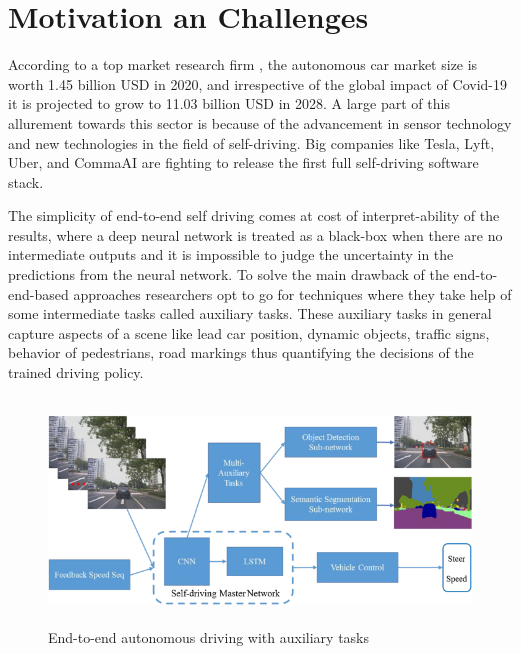     \section{Motivation an Challenges}
    According to a top market research firm \cite{market_survey}, the autonomous car market size is worth 1.45 billion USD in 2020, and irrespective of the global impact of Covid-19 it is projected to grow to 11.03 billion USD in 2028. A large part of this allurement towards this sector is because of the advancement in sensor technology and new technologies in the field of self-driving. Big companies like Tesla, Lyft, Uber, and CommaAI are fighting to release the first full self-driving software stack. 
\par The simplicity of end-to-end self driving comes at cost of interpret-ability of the results, where a deep neural network is treated as a black-box when there are no intermediate outputs and it is impossible to judge the uncertainty in the predictions from the neural network. To solve the main drawback of the end-to-end-based approaches researchers opt to go for techniques where they take help of some intermediate tasks called auxiliary tasks. These auxiliary tasks in general capture aspects of a scene like lead car position, dynamic objects, traffic signs, behavior of pedestrians, road markings thus quantifying the decisions of the trained driving policy. 

 \begin{figure}[h]
    \centering
    \includegraphics[width=12cm, height=6cm]{images/replace1.png}
    \caption{End-to-end autonomous driving with auxiliary tasks \cite{Wang2019EndtoEndSU}}
\end{figure}

